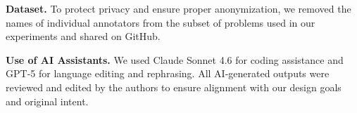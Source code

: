 

\noindent\textbf{Dataset.}  
To protect privacy and ensure proper anonymization, we removed the names of individual annotators from the subset of problems used in our experiments and shared on GitHub.

\noindent\textbf{Use of AI Assistants.}  
We used Claude Sonnet 4.6 for coding assistance and GPT-5 for language editing and rephrasing. All AI-generated outputs were reviewed and edited by the authors to ensure alignment with our design goals and original intent.

